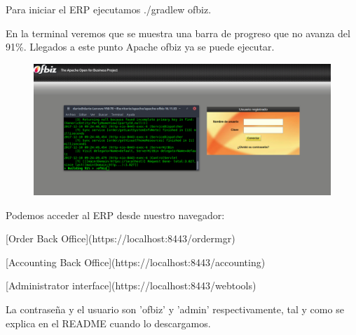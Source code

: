 \begin{frame}
Para iniciar el ERP ejecutamos ./gradlew ofbiz.

En la terminal veremos que se muestra una barra de progreso que no avanza del 91\%.
Llegados a este punto Apache ofbiz ya se puede ejecutar.

\begin{figure}[H]
	\centering
	\includegraphics[width=0.65\linewidth]{img/4.png}
\end{figure}

Podemos acceder al ERP desde nuestro navegador:

[Order Back Office](https://localhost:8443/ordermgr)

[Accounting Back Office](https://localhost:8443/accounting)

[Administrator interface](https://localhost:8443/webtools)

La contraseña y el usuario son 'ofbiz' y 'admin' respectivamente, tal y como se explica en el README cuando lo descargamos.
\end{frame}

